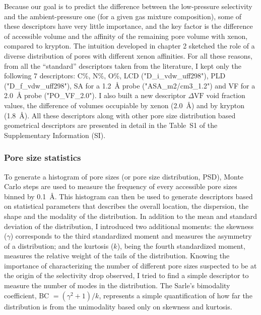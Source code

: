 \documentclass[main]{subfiles}
\begin{document}
Because our goal is to predict the difference between the low-pressure selectivity and the ambient-pressure one (for a given gas mixture composition), some of these descriptors have very little importance, and the key factor is the difference of accessible volume and the affinity of the remaining pore volume with xenon, compared to krypton. The intuition developed in chapter 2 sketched the role of a diverse distribution of pores with different xenon affinities. For all these reasons, from all the ``standard'' descriptors taken from the literature, I kept only the following 7 descriptors: C\%, N\%, O\%, LCD ("D\_i\_vdw\_uff298"), PLD ("D\_f\_vdw\_uff298"), SA for a \SI{1.2}{\angstrom} probe ("ASA\_m2/cm3\_1.2") and VF for a \SI{2.0}{\angstrom} probe ("PO\_VF\_2.0"). I also built a new descriptor $\Delta \text{VF}$ void fraction values, the difference of volumes occupiable by xenon (\SI{2.0}{\angstrom}) and by krypton (\SI{1.8}{\angstrom}). All these descriptors along with other pore size distribution based geometrical descriptors are presented in detail in the Table~S1 of the Supplementary Information (SI).

\subsubsection{Pore size statistics}

To generate a histogram of pore sizes (or pore size distribution, PSD), Monte Carlo steps are used to measure the frequency of every accessible pore sizes binned by \SI{0.1}{\angstrom}.\autocite{poresize_Pinheiro2013} This histogram can then be used to generate descriptors based on statistical parameters that describes the overall location, the dispersion, the shape and the modality of the distribution. In addition to the mean and standard deviation of the distribution, I introduced two additional moments: the skewness ($\gamma$) corresponds to the third standardized moment and measures the asymmetry of a distribution; and the kurtosis ($k$), being the fourth standardized moment, measures the relative weight of the tails of the distribution. Knowing the importance of characterizing the number of different pore sizes suspected to be at the origin of the selectivity drop observed, I tried to find a simple descriptor to measure the number of modes in the distribution. The Sarle's bimodality coefficient, BC $= (\gamma^2 +1)/k$, represents a simple quantification of how far the distribution is from the unimodality based only on skewness and kurtosis.\autocite{Tarba_2022}
\end{document}
